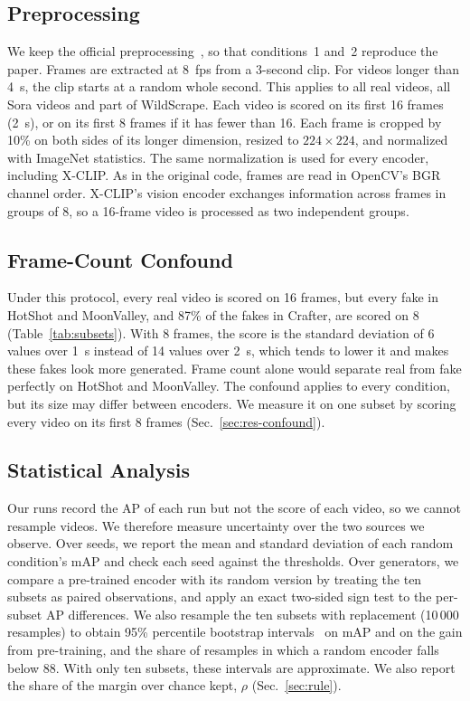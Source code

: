 \documentclass[conference]{IEEEtran}
\begin{document}
\subsection{Preprocessing}

We keep the official preprocessing~\cite{d3code}, so that conditions~1 and~2
reproduce the paper. Frames are extracted at 8~fps from a 3-second clip. For
videos longer than 4~s, the clip starts at a random whole second. This applies
to all real videos, all Sora videos and part of WildScrape. Each video is
scored on its first 16 frames (2~s), or on its first 8 frames if it has fewer
than 16. Each frame is cropped by 10\% on both sides of its longer dimension,
resized to $224\times224$, and normalized with ImageNet statistics. The same
normalization is used for every encoder, including X-CLIP. As in the original
code, frames are read in OpenCV's BGR channel order. X-CLIP's vision encoder
exchanges information across frames in groups of 8, so a 16-frame video is
processed as two independent groups.

\subsection{Frame-Count Confound}
\label{sec:confound}

Under this protocol, every real video is scored on 16 frames, but every fake
in HotShot and MoonValley, and 87\% of the fakes in Crafter, are scored on 8
(Table~\ref{tab:subsets}). With 8 frames, the score is the standard deviation
of 6 values over 1~s instead of 14 values over 2~s, which tends to lower it
and makes these fakes look more generated. Frame count alone would separate
real from fake perfectly on HotShot and MoonValley. The confound applies to
every condition, but its size may differ between encoders. We measure it on
one subset by scoring every video on its first 8 frames
(Sec.~\ref{sec:res-confound}).

\subsection{Statistical Analysis}
\label{sec:stats}

Our runs record the AP of each run but not the score of each video, so we
cannot resample videos. We therefore measure uncertainty over the two sources
we observe. Over seeds, we report the mean and standard deviation of each
random condition's mAP and check each seed against the thresholds. Over
generators, we compare a pre-trained encoder with its random version by
treating the ten subsets as paired observations, and apply an exact two-sided
sign test to the per-subset AP differences. We also resample the ten subsets
with replacement (10\,000 resamples) to obtain 95\% percentile bootstrap
intervals~\cite{efron1993} on mAP and on the gain from pre-training, and the
share of resamples in which a random encoder falls below 88. With only ten
subsets, these intervals are approximate. We also report the share of the
margin over chance kept, $\rho$ (Sec.~\ref{sec:rule}).
\end{document}
